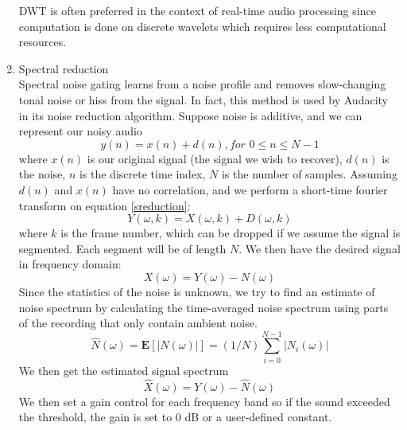 \begin{enumerate}
	DWT is often preferred in the context of real-time audio processing since computation is done on discrete wavelets which requires less computational resources.
	
	\item Spectral reduction\\
	Spectral noise gating learns from a noise profile and removes slow-changing tonal noise or hiss from the signal. In 
	fact, this method is used by Audacity in its noise reduction algorithm. 
	Suppose noise is additive, and we can represent our noisy audio 
	\[y(n) = x(n) + d(n), \textit{for } 0 \leq n \leq N-1 \label{sreduction} \]
	where $x(n)$ is our original signal (the signal we wish to recover), $d(n)$ is the noise, $n$ is the discrete time index,
	$N$ is the number of samples. 
	Assuming $d(n)$ and $x(n)$ have no correlation, and we perform a short-time fourier transform on equation \ref{sreduction}:
	\[Y(\omega,k)= X(\omega,k) + D(\omega,k)\]
	where $k$ is the frame number, which can be dropped if we assume the signal is segmented. Each segment will be of
	length $N$. We then have the desired signal in frequency domain:
	\[X(\omega) = Y(\omega) - N(\omega)\]
	Since the statistics of the noise is unknown, we try to find an estimate of noise spectrum by calculating the time-averaged
	noise spectrum using parts of the recording that only contain ambient noise. 
	\[\hat{N}(\omega) = \textbf{E}[|N(\omega)|] = (1/N)\sum_{i=0}^{N-1}|N_i(\omega)|\]
	We then get the estimated signal spectrum
	\[\hat{X}(\omega) = Y(\omega) - \hat{N}(\omega)\]
	We then set a gain control for each frequency band so if the sound exceeded the threshold, the gain is set to 0 dB or a user-defined
	constant.
\end{enumerate}
